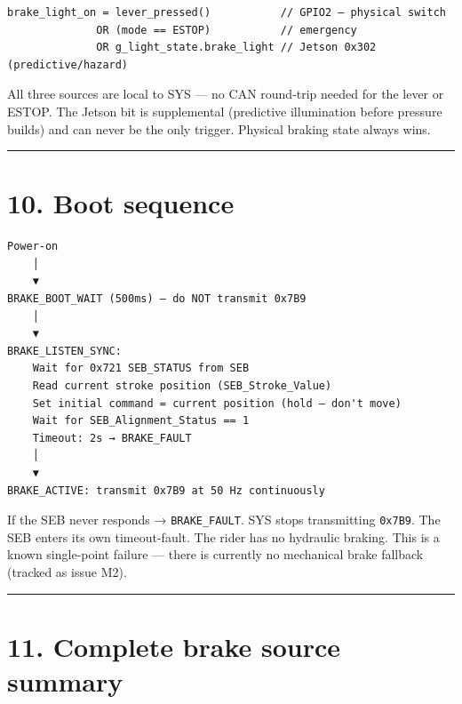 \documentclass[12pt,a4paper,oneside]{report}
\begin{document}
\begin{verbatim}
brake_light_on = lever_pressed()           // GPIO2 — physical switch
              OR (mode == ESTOP)           // emergency
              OR g_light_state.brake_light // Jetson 0x302 (predictive/hazard)
\end{verbatim}

All three sources are local to SYS --- no CAN round-trip needed for the lever or
ESTOP. The Jetson bit is supplemental (predictive illumination before pressure
builds) and can never be the only trigger. Physical braking state always wins.

\begin{center}\rule{0.5\linewidth}{0.5pt}\end{center}

\section{10. Boot sequence}\label{boot-sequence}

\begin{verbatim}
Power-on
    │
    ▼
BRAKE_BOOT_WAIT (500ms) — do NOT transmit 0x7B9
    │
    ▼
BRAKE_LISTEN_SYNC:
    Wait for 0x721 SEB_STATUS from SEB
    Read current stroke position (SEB_Stroke_Value)
    Set initial command = current position (hold — don't move)
    Wait for SEB_Alignment_Status == 1
    Timeout: 2s → BRAKE_FAULT
    │
    ▼
BRAKE_ACTIVE: transmit 0x7B9 at 50 Hz continuously
\end{verbatim}

If the SEB never responds → \texttt{BRAKE\_FAULT}. SYS stops transmitting
\texttt{0x7B9}. The SEB enters its own timeout-fault. The rider has no hydraulic
braking. This is a known single-point failure --- there is currently no
mechanical brake fallback (tracked as issue M2).

\begin{center}\rule{0.5\linewidth}{0.5pt}\end{center}

\section{11. Complete brake source summary}\label{complete-brake-source-summary}
\end{document}
